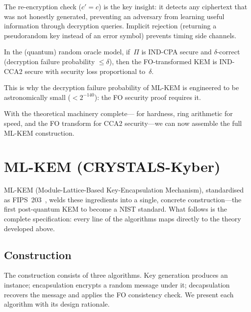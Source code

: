 The re-encryption check ($c' = c$) is the key insight: it detects any ciphertext that was not honestly generated, preventing an adversary from learning useful information through decryption queries.  Implicit rejection (returning a pseudorandom key instead of an error symbol) prevents timing side channels.

\begin{theorem}
\label{thm:fo-security}
In the (quantum) random oracle model, if~$\Pi$ is IND-CPA secure and $\delta$-correct (decryption failure probability $\leq \delta$), then the FO-transformed KEM is IND-CCA2 secure with security loss proportional to~$\delta$.
\end{theorem}

This is why the decryption failure probability of ML-KEM is engineered to be astronomically small ($< 2^{-140}$): the FO security proof requires it.

With the theoretical machinery complete---\mlwe{} for hardness, ring arithmetic for speed, and the FO transform for CCA2 security---we can now assemble the full ML-KEM construction.


\section{ML-KEM (CRYSTALS-Kyber)}
\label{sec:ml-kem}

ML-KEM (Module-Lattice-Based Key-Encapsulation Mechanism), standardised as FIPS~203~\cite{FIPS203}, welds these ingredients into a single, concrete construction---the first post-quantum KEM to become a NIST standard.  What follows is the complete specification: every line of the algorithms maps directly to the theory developed above.

\subsection{Construction}
\label{subsec:mlkem-construction}

The construction consists of three algorithms.  Key generation produces an \mlwe{} instance; encapsulation encrypts a random message under it; decapsulation recovers the message and applies the FO consistency check.  We present each algorithm with its design rationale.

